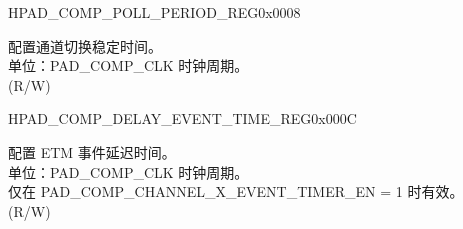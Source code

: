 \begin{register}{H}{PAD\_COMP\_POLL\_PERIOD\_REG}{0x0008}\label{regdesc:PADCOMPPOLLPERIODREG}
%
%
\regnewline%
\begin{regdesc}\begin{reglist}
\label{fielddesc:PADCOMPPOLLPERIOD}\item [PAD\_COMP\_POLL\_PERIOD] 配置通道切换稳定时间。\\
单位：PAD\_COMP\_CLK 时钟周期。\\
(R/W)
\end{reglist}\end{regdesc}
\end{register}


\begin{register}{H}{PAD\_COMP\_DELAY\_EVENT\_TIME\_REG}{0x000C}\label{regdesc:PADCOMPDELAYEVENTTIMEREG}
%
%
\regnewline%
\begin{regdesc}\begin{reglist}
\label{fielddesc:PADCOMPDELAYEVENTTIME}\item [PAD\_COMP\_DELAY\_EVENT\_TIME] 配置 ETM 事件延迟时间。\\
单位：PAD\_COMP\_CLK 时钟周期。\\
仅在 PAD\_COMP\_CHANNEL\_X\_EVENT\_TIMER\_EN = 1 时有效。\\
(R/W)
\end{reglist}\end{regdesc}
\end{register}


